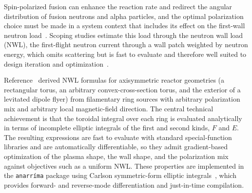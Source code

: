 \documentclass[11pt]{article}
\begin{document}
Spin-polarized fusion can enhance the reaction rate and redirect the angular distribution of fusion neutrons and alpha particles, and the optimal polarization choice must be made in a system context that includes its effect on the first-wall neutron load~\cite{kulsrud1982,parisi2024,schwartz2025}. Scoping studies estimate this load through the neutron wall load (NWL), the first-flight neutron current through a wall patch weighted by neutron energy, which omits scattering but is fast to evaluate and therefore well suited to design iteration and optimization~\cite{lion2022,schwartz2025}.

Reference~\cite{schwartz2025} derived NWL formulas for axisymmetric reactor geometries (a rectangular torus, an arbitrary convex-cross-section torus, and the exterior of a levitated dipole flyer) from filamentary ring sources with arbitrary polarization mix and arbitrary local magnetic-field direction. The central technical achievement is that the toroidal integral over each ring is evaluated analytically in terms of incomplete elliptic integrals of the first and second kinds, $F$ and $E$. The resulting expressions are fast to evaluate with standard special-function libraries and are automatically differentiable, so they admit gradient-based optimization of the plasma shape, the wall shape, and the polarization mix against objectives such as a uniform NWL. These properties are implemented in the \texttt{anarr\'ima} package using Carlson symmetric-form elliptic integrals~\cite{carlson1979,carlson1995}, which provides forward- and reverse-mode differentiation and just-in-time compilation.
\end{document}
